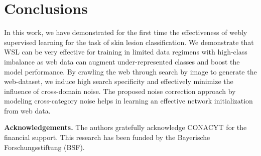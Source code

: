 \documentclass{llncs}
\begin{document}
\section{Conclusions}
In this work, we have demonstrated for the first time the effectiveness of webly supervised learning for the task of skin lesion classification. We demonstrate that WSL can be very effective for training in limited data regimens with high-class imbalance as web data can augment under-represented classes and boost the model performance. 
By crawling the web through search by image to generate the web-dataset, we induce high search specificity and effectively minimize the influence of cross-domain noise. The proposed noise correction approach by modeling cross-category noise helps in learning an effective network initialization from web data. 

\noindent
\textbf{Acknowledgements.} The authors gratefully acknowledge CONACYT for the financial support.
This research has been funded by the Bayerische Forschungsstiftung (BSF).
\end{document}
